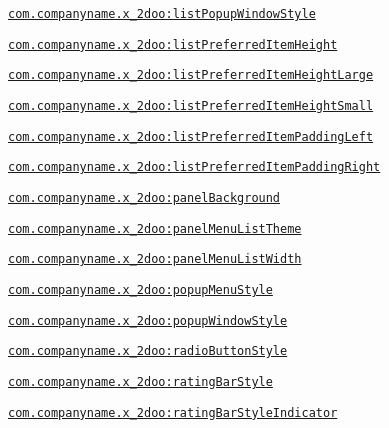 {\tt \hyperlink{classandroid_1_1support_1_1v4_1_1_r_1_1styleable_bd2ee13ff17345e9f5fe98bc84202b71}{com.companyname.x\_\-2doo:listPopupWindowStyle}}

{\tt \hyperlink{classandroid_1_1support_1_1v4_1_1_r_1_1styleable_54d99bb5430cafe306a647e9b8c23557}{com.companyname.x\_\-2doo:listPreferredItemHeight}}

{\tt \hyperlink{classandroid_1_1support_1_1v4_1_1_r_1_1styleable_8e939e05300583b0aef1b0e9e345f506}{com.companyname.x\_\-2doo:listPreferredItemHeightLarge}}

{\tt \hyperlink{classandroid_1_1support_1_1v4_1_1_r_1_1styleable_fee8f8be3df435711c5bb0d3b5eb1bdd}{com.companyname.x\_\-2doo:listPreferredItemHeightSmall}}

{\tt \hyperlink{classandroid_1_1support_1_1v4_1_1_r_1_1styleable_9cce233669ccd45e691fcd5ebd0a293a}{com.companyname.x\_\-2doo:listPreferredItemPaddingLeft}}

{\tt \hyperlink{classandroid_1_1support_1_1v4_1_1_r_1_1styleable_265ab9cd877ed88fe04ba61fc41703e3}{com.companyname.x\_\-2doo:listPreferredItemPaddingRight}}

{\tt \hyperlink{classandroid_1_1support_1_1v4_1_1_r_1_1styleable_1423cc9159dec9dd298b6391ef1df328}{com.companyname.x\_\-2doo:panelBackground}}

{\tt \hyperlink{classandroid_1_1support_1_1v4_1_1_r_1_1styleable_8e2495f71c94aa2c96f2965980b2f309}{com.companyname.x\_\-2doo:panelMenuListTheme}}

{\tt \hyperlink{classandroid_1_1support_1_1v4_1_1_r_1_1styleable_5eae8eccd5625c8acb9a2d0522e7fd35}{com.companyname.x\_\-2doo:panelMenuListWidth}}

{\tt \hyperlink{classandroid_1_1support_1_1v4_1_1_r_1_1styleable_833514c9937294d571844e13b7a70786}{com.companyname.x\_\-2doo:popupMenuStyle}}

{\tt \hyperlink{classandroid_1_1support_1_1v4_1_1_r_1_1styleable_7b4761ddad1866b99166d9027b1a91de}{com.companyname.x\_\-2doo:popupWindowStyle}}

{\tt \hyperlink{classandroid_1_1support_1_1v4_1_1_r_1_1styleable_530d6e3b48153addedc781558453a828}{com.companyname.x\_\-2doo:radioButtonStyle}}

{\tt \hyperlink{classandroid_1_1support_1_1v4_1_1_r_1_1styleable_03df554f42548e6c63fa0608aaba9647}{com.companyname.x\_\-2doo:ratingBarStyle}}

{\tt \hyperlink{classandroid_1_1support_1_1v4_1_1_r_1_1styleable_8ba7f811197cd79ba92bd8c7919d4936}{com.companyname.x\_\-2doo:ratingBarStyleIndicator}}

